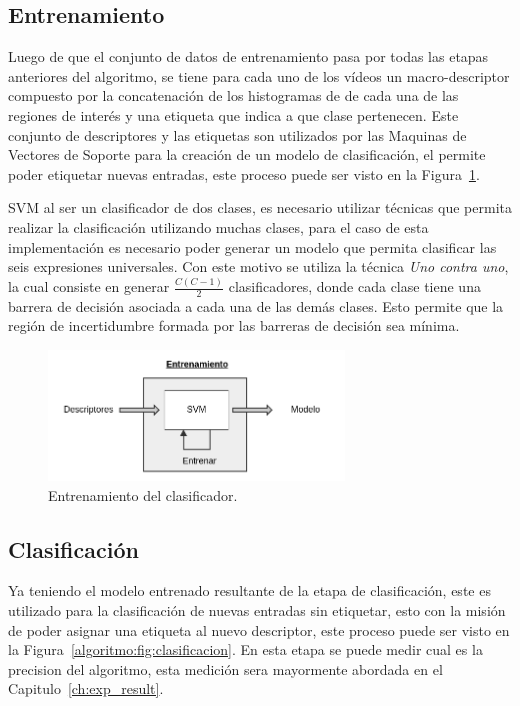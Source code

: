 	\subsection{Entrenamiento}
	\label{algoritmo:entrenamiento}
		Luego de que el conjunto de datos de entrenamiento pasa por todas las etapas anteriores del algoritmo, se tiene para cada uno de los vídeos un macro-descriptor compuesto por la concatenación de los histogramas de de cada una de las regiones de interés y una etiqueta que indica a que clase pertenecen. Este conjunto de descriptores y las etiquetas son utilizados por las Maquinas de Vectores de Soporte para la creación de un modelo de clasificación, el permite poder etiquetar nuevas entradas, este proceso puede ser visto en la Figura~\ref{algoritmo:fig:entrenamiento}.
	
	SVM al ser un clasificador de dos clases, es necesario utilizar técnicas que permita realizar la clasificación utilizando muchas clases, para el caso de esta implementación es necesario poder generar un modelo que permita clasificar las seis expresiones universales. Con este motivo se utiliza la técnica \textit{Uno contra uno}, la cual consiste en generar $\frac{C(C-1)}{2}$ clasificadores, donde cada clase tiene una barrera de decisión asociada a cada una de las demás clases. Esto permite que la región de incertidumbre formada por las barreras de decisión sea mínima.
		
		
	\begin{figure}[bt]
		\centering
  		\label{algoritmo:fig:entrenamiento}
    		\includegraphics[width=0.7\textwidth]{Figuras/Diagramas/Entrenamiento.png}
  		\caption{Entrenamiento del clasificador.}
	\end{figure}	
		
		
	\subsection{Clasificación}
	\label{algoritmo:clasificacion}
		Ya teniendo el modelo entrenado resultante de la etapa de clasificación, este es utilizado para la clasificación de nuevas entradas sin etiquetar, esto con la misión de poder asignar una etiqueta al nuevo descriptor, este proceso puede ser visto en la Figura~\ref{algoritmo:fig:clasificacion}. En esta etapa se puede medir cual es la precision del algoritmo, esta medición sera mayormente abordada en el Capitulo~\ref{ch:exp_result}.
		
